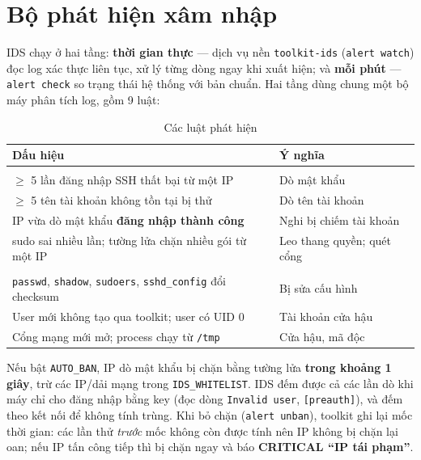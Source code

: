 \documentclass[12pt,a4paper,oneside]{report}
\newcommand{\cmd}[1]{\texttt{\small #1}}
\begin{document}
\section{Bộ phát hiện xâm nhập}
IDS chạy ở hai tầng: \textbf{thời gian thực} — dịch vụ nền \cmd{toolkit-ids} (\cmd{alert watch}) đọc log xác thực liên tục, xử lý từng dòng ngay khi xuất hiện; và \textbf{mỗi phút} — \cmd{alert check} so trạng thái hệ thống với bản chuẩn. Hai tầng dùng chung một bộ máy phân tích log, gồm 9 luật:
\begin{table}[H]\centering\small
\caption{Các luật phát hiện}
\begin{tabularx}{\textwidth}{>{\raggedright\arraybackslash}p{6.6cm}L}
\toprule
\textbf{Dấu hiệu} & \textbf{Ý nghĩa}\\\midrule
{}\\
$\ge$ 5 lần đăng nhập SSH thất bại từ một IP & Dò mật khẩu\\
$\ge$ 5 tên tài khoản không tồn tại bị thử & Dò tên tài khoản\\
IP vừa dò mật khẩu \textbf{đăng nhập thành công} & Nghi bị chiếm tài khoản\\
sudo sai nhiều lần; tường lửa chặn nhiều gói từ một IP & Leo thang quyền; quét cổng\\
\\
\cmd{passwd}, \cmd{shadow}, \cmd{sudoers}, \cmd{sshd\_config} đổi checksum & Bị sửa cấu hình\\
User mới không tạo qua toolkit; user có UID 0 & Tài khoản cửa hậu\\
Cổng mạng mới mở; process chạy từ \cmd{/tmp} & Cửa hậu, mã độc\\
\bottomrule
\end{tabularx}
\end{table}
Nếu bật \cmd{AUTO\_BAN}, IP dò mật khẩu bị chặn bằng tường lửa \textbf{trong khoảng 1 giây}, trừ các IP/dải mạng trong \cmd{IDS\_WHITELIST}. IDS đếm được cả các lần dò khi máy chỉ cho đăng nhập bằng key (đọc dòng \cmd{Invalid user}, \cmd{[preauth]}), và đếm theo kết nối để không tính trùng. Khi bỏ chặn (\cmd{alert unban}), toolkit ghi lại mốc thời gian: các lần thử \textit{trước} mốc không còn được tính nên IP không bị chặn lại oan; nếu IP tấn công tiếp thì bị chặn ngay và báo \textbf{CRITICAL ``IP tái phạm''}.
\end{document}
